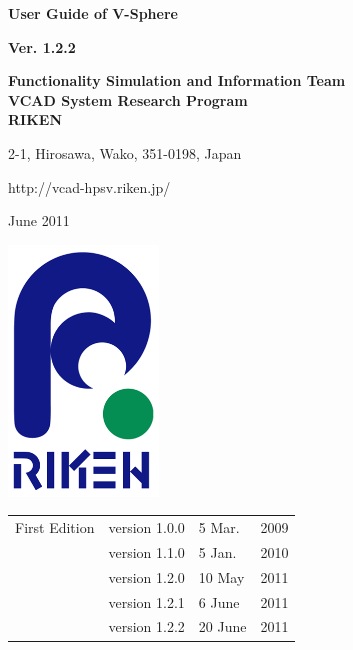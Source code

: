 \documentclass[a4paper,10pt,oneside,fleqn]{jsbook}
\begin{document}
\begin{titlepage}
\begin{center}
\vspace*{3cm}
{\huge \textbf{User Guide of V-Sphere}}\\
\vspace{1cm}

{\large \textbf{Ver. 1.2.2}}\\
\vspace{1.5cm}

{\large \textbf{Functionality Simulation and Information Team}\\
\large \textbf{VCAD System Research Program}\\
\large \textbf{RIKEN}\\
\vspace{1cm}
}

{\large 2-1, Hirosawa, Wako, 351-0198, Japan}\\
\vspace{0.5cm}

{http://vcad-hpsv.riken.jp/}\\
\vspace{1cm}

June 2011\\
\vspace{4cm}

\includegraphics[width=4cm,bb=-80 0 220 500]{RIKEN_logo_300x500.png}

\end{center}
\end{titlepage}
\newpage


%
\frontmatter

\begin{tabular}{lllr}
First Edition  &  version 1.0.0  &  5 Mar.  &  2009\\
               &  version 1.1.0  &  5 Jan.  &  2010\\
               &  version 1.2.0  & 10 May   &  2011\\
               &  version 1.2.1  &  6 June  &  2011\\
               &  version 1.2.2  & 20 June  &  2011
\end{tabular}
\end{document}
